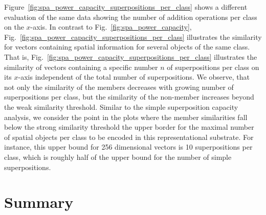 Figure~\ref{fig:spa_power_capacity_superpositions_per_class} shows a different evaluation of the same data showing the number of addition operations per class on the $x$-axis.
In contrast to Fig.~\ref{fig:spa_power_capacity}, Fig.~\ref{fig:spa_power_capacity_superpositions_per_class} illustrates the similarity for vectors containing spatial information for several objects of the same class.
That is, Fig.~\ref{fig:spa_power_capacity_superpositions_per_class} illustrates the similarity of vectors containing a specific number $n$ of superpositions per class on its $x$-axis independent of the total number of superpositions.
We observe, that not only the similarity of the members decreases with growing number of superpositions per class, but the similarity of the non-member increases beyond the weak similarity threshold.
Similar to the simple superposition capacity analysis, we consider the point in the plots where the member similarities fall below the strong similarity threshold the upper border for the maximal number of spatial objects per class to be encoded in this representational substrate.
For instance, this upper bound for \num{256} dimensional vectors is \num{10} superpositions per class, which is roughly half of the upper bound for the number of simple superpositions.

\section{Summary}%
\label{sec:vector_representations_automotive_summary}

